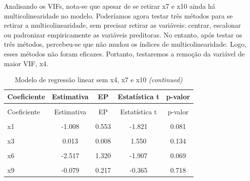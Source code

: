 \documentclass[
  letterpaper,
  DIV=11,
  numbers=noendperiod]{scrartcl}
\begin{document}
Analisando os VIFs, nota-se que apesar de se retirar x7 e x10 ainda há
multicolinearidade no modelo. Poderíamos agora testar três métodos para
se retirar a multicolinearidade, sem precisar retirar as variáveis:
centrar, escalonar ou padronizar empiricamente as variáveis preditoras.
No entanto, após testar os três métodos, percebeu-se que não mudou os
índices de multicolinearidade. Logo, esses métodos não foram eficazes.
Portanto, testaremos a remoção da variável de maior VIF, x4.

\begin{longtable}[t]{lcccc}
\caption{Modelo de regressão linear sem x4, x7 e x10}\\
\toprule
Coeficiente & Estimativa & EP & Estatística t & p-valor\\
\midrule
\endfirsthead
\caption[]{Modelo de regressão linear sem x4, x7 e x10 \textit{(continued)}}\\
\toprule
Coeficiente & Estimativa & EP & Estatística t & p-valor\\
\midrule
\endhead

\endfoot
\bottomrule
\endlastfoot
\cellcolor{gray!15}{(Intercept)} & \cellcolor{gray!15}{-8.931} & \cellcolor{gray!15}{14.057} & \cellcolor{gray!15}{-0.635} & \cellcolor{gray!15}{0.531}\\
x1 & -1.008 & 0.553 & -1.821 & 0.081\\
\cellcolor{gray!15}{x2} & \cellcolor{gray!15}{6.267} & \cellcolor{gray!15}{3.242} & \cellcolor{gray!15}{1.933} & \cellcolor{gray!15}{0.065}\\
x3 & 0.013 & 0.008 & 1.550 & 0.134\\
\cellcolor{gray!15}{x5} & \cellcolor{gray!15}{2.250} & \cellcolor{gray!15}{1.115} & \cellcolor{gray!15}{2.017} & \cellcolor{gray!15}{0.055}\\
x6 & -2.517 & 1.320 & -1.907 & 0.069\\
\cellcolor{gray!15}{x8} & \cellcolor{gray!15}{-11.994} & \cellcolor{gray!15}{7.816} & \cellcolor{gray!15}{-1.534} & \cellcolor{gray!15}{0.138}\\
x9 & -0.079 & 0.217 & -0.365 & 0.718\\*
\end{longtable}
\end{document}
